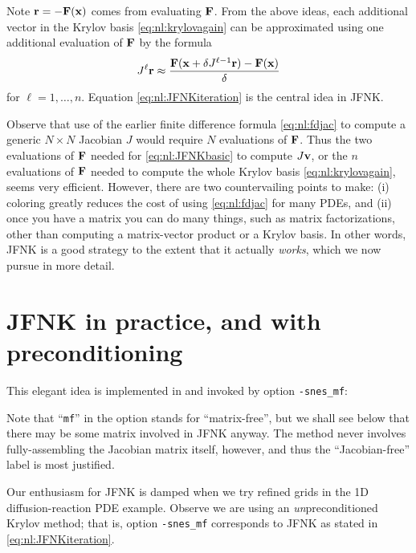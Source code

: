 Note $\mathbf{r} = - \mathbf{F}(\mathbf{x})$ comes from evaluating $\mathbf{F}$.  From the above ideas, each additional vector in the Krylov basis \eqref{eq:nl:krylovagain} can be approximated using one additional evaluation of $\mathbf{F}$ by the formula
\begin{equation}
J^{\ell} \mathbf{r} \approx \frac{\mathbf{F}(\mathbf{x}+\delta J^{\ell-1}\mathbf{r}) - \mathbf{F}(\mathbf{x})}{\delta} \label{eq:nl:JFNKiteration}
\end{equation}
for $\ell=1,\dots,n$.  Equation \eqref{eq:nl:JFNKiteration} is the central idea in JFNK.

Observe that use of the earlier finite difference formula \eqref{eq:nl:fdjac} to compute a generic $N\times N$ Jacobian $J$ would require $N$ evaluations of $\mathbf{F}$.  Thus the two evaluations of $\mathbf{F}$ needed for \eqref{eq:nl:JFNKbasic} to compute $J\mathbf{v}$, or the $n$ evaluations of $\mathbf{F}$ needed to compute the whole Krylov basis \eqref{eq:nl:krylovagain}, seems very efficient.  However, there are two countervailing points to make: (i) coloring greatly reduces the cost of using \eqref{eq:nl:fdjac} for many PDEs, and (ii) once you have a matrix you can do many things, such as matrix factorizations, other than computing a matrix-vector product or a Krylov basis.  In other words, JFNK is a good strategy to the extent that it actually \emph{works}, which we now pursue in more detail.


\section{JFNK in practice, and with preconditioning} \label{sec:JFNKprecond}

This elegant idea is implemented in \PETSc and invoked by option \texttt{-snes\_mf}:
Note that ``\texttt{mf}'' in the option stands for ``matrix-free'', but we shall see below that there may be some matrix involved in JFNK anyway.  The method never involves fully-assembling the Jacobian matrix itself, however, and thus the ``Jacobian-free'' label is most justified.

Our enthusiasm for JFNK is damped when we try refined grids in the 1D diffusion-reaction PDE example.  Observe we are using an \emph{un}preconditioned Krylov method; that is, option \texttt{-snes\_mf} corresponds to JFNK as stated in \eqref{eq:nl:JFNKiteration}.

